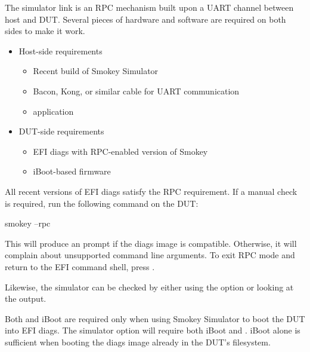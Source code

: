 The simulator link is an RPC mechanism built upon a UART channel between host
and DUT.  Several pieces of hardware and software are required on both sides to
make it work.

\begin{itemize}

\item Host-side requirements

	\begin{itemize}

	\item Recent build of Smokey Simulator

	\item Bacon, Kong, or similar cable for UART communication

	\item {} application \optional

	\end{itemize}

\item DUT-side requirements

	\begin{itemize}

	\item EFI diags with RPC-enabled version of Smokey

	\item iBoot-based firmware \optional

	\end{itemize}

\end{itemize}

All recent versions of EFI diags satisfy the RPC requirement.  If a manual
check is required, run the following command on the DUT:

\begin{CommandLine}
smokey --rpc
\end{CommandLine}

This will produce an  prompt if the diags image is compatible.
Otherwise, it will complain about unsupported command line arguments.  To exit
RPC mode and return to the EFI command shell, press \KeyCapsCtrlD.

Likewise, the simulator can be checked by either using the 
option or looking at the  output.

Both  and iBoot are required only when using Smokey Simulator
to boot the DUT into EFI diags.  The simulator option  will
require both iBoot and .  iBoot alone is sufficient when
booting the diags image already in the DUT's filesystem.

